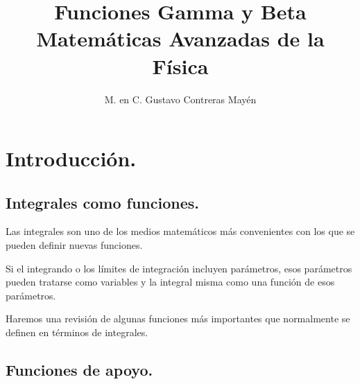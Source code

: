 
\usepackage{apacite}
\title{Funciones Gamma y Beta \\[0.3em]  \large{Matemáticas Avanzadas de la Física}\vspace{-3ex}}
\author{M. en C. Gustavo Contreras Mayén}
\date{ }

\vspace{-4cm}
\maketitle
\fontsize{14}{14}\selectfont
\tableofcontents
\newpage

\section{Introducción.}

\subsection{Integrales como funciones.}

Las integrales son uno de los medios matemáticos más convenientes con los que se pueden definir nuevas funciones.
\par
Si el integrando o los límites de integración incluyen parámetros, esos parámetros pueden tratarse como variables y la integral misma como una función de esos parámetros.
\par
Haremos una revisión de algunas funciones más importantes que normalmente se definen en términos de integrales.

\subsection{Funciones de apoyo.}

